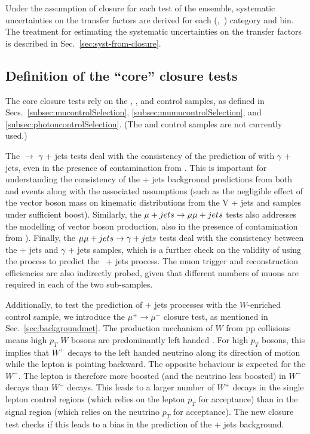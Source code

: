 Under the assumption of closure for each test of the ensemble,
systematic uncertainties on the transfer factors are derived for each
(\njet,~\nb) category and \scalht bin. The treatment for estimating
the systematic uncertainties on the transfer factors is described in
Sec.~\ref{sec:syst-from-closure}.


\subsection{Definition of the ``core'' closure tests}
\label{sec:closure-test-def}

The core closure tests rely on the \mj, \mmj, and \gj control samples,
as defined in Secs.~\ref{subsec:mucontrolSelection},
\ref{subsec:mumucontrolSelection}, and
\ref{subsec:photoncontrolSelection}. (The \ej and \eej control samples
are not currently used.)

The \mj $\rightarrow$ $\gamma$ + jets tests deal with the consistency
of the prediction of \wej with $\gamma$ + jets, even in the presence
of contamination from \ttbar. This is important for understanding the
consistency of the \znunu + jets background predictions from both \wej
and \gj events along with the associated assumptions (such as the
negligible effect of the vector boson mass on kinematic distributions
from the V + jets and \gj samples under sufficient boost). Similarly,
the $\mu + jets \rightarrow \mu\mu + jets$ tests also addresses the modelling of
vector boson production, also in the presence of contamination from
\ttbar). Finally, the $\mu\mu + jets \rightarrow \gamma + jets$ tests deal with the
consistency between the \zee + jets and $\gamma$ + jets samples, which
is a further check on the validity of using the \gj process to predict
the \znunu\, + jets process. The muon trigger and reconstruction
efficiencies are also indirectly probed, given that different numbers
of muons are required in each of the two sub-samples.

Additionally, to test the prediction of \znunu + jets processes with
the $W$-enriched \mj control sample, we introduce the
$\mu^{+}\rightarrow\mu^{-}$ closure test, as mentioned in
Sec.~\ref{sec:backgroundmet}. The production mechanism of $W$ from pp
collisions means high $p_T$ $W$ bosons are predominantly left handed
\cite{WPol}.  For high $p_T$ bosons, this implies that $W^+$ decays to
the left handed neutrino along its direction of motion while the
lepton is pointing backward. The opposite behaviour is expected for
the $W^-$. The lepton is therefore more boosted (and the neutrino less
boosted) in $W^+$ decays than $W^-$ decays.  This leads to a larger
number of $W^+$ decays in the single lepton control regions (which
relies on the lepton $p_T$ for acceptance) than in the signal region
(which relies on the neutrino $p_T$ for acceptance). The new closure
test checks if this leads to a bias in the prediction of the \znunu +
jets background. 

